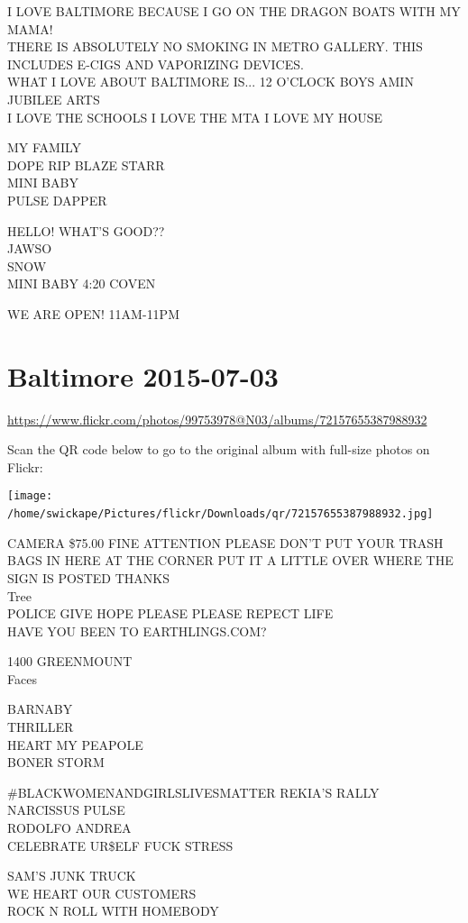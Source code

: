 \documentclass[10pt,letterpaper]{article}
\begin{document}
I LOVE BALTIMORE BECAUSE I GO ON THE DRAGON BOATS WITH MY MAMA!\\
THERE IS ABSOLUTELY NO SMOKING IN METRO GALLERY.  THIS INCLUDES E{-}CIGS AND VAPORIZING DEVICES.\\
WHAT I LOVE ABOUT BALTIMORE IS... 12 O'CLOCK BOYS AMIN JUBILEE ARTS\\
I LOVE THE SCHOOLS I LOVE THE MTA I LOVE MY HOUSE

MY FAMILY\\
DOPE RIP BLAZE STARR\\
MINI BABY\\
PULSE DAPPER

HELLO!  WHAT'S GOOD??\\
JAWSO\\
SNOW\\
MINI BABY 4:20 COVEN

WE ARE OPEN!  11AM{-}11PM
\

\section*{Baltimore 2015-07-03}

\url{https://www.flickr.com/photos/99753978@N03/albums/72157655387988932}

Scan the QR code below to go to the original album with full-size photos on Flickr:

\texttt{[image: /home/swickape/Pictures/flickr/Downloads/qr/72157655387988932.jpg]}
\

CAMERA \$75.00 FINE ATTENTION PLEASE DON'T PUT YOUR TRASH BAGS IN HERE AT THE CORNER PUT IT A LITTLE OVER WHERE THE SIGN IS POSTED THANKS\\
Tree\\
POLICE GIVE HOPE PLEASE PLEASE REPECT LIFE\\
HAVE YOU BEEN TO EARTHLINGS.COM?

1400 GREENMOUNT\\
Faces

BARNABY\\
THRILLER\\
HEART MY PEAPOLE\\
BONER STORM

\#BLACKWOMENANDGIRLSLIVESMATTER REKIA'S RALLY\\
NARCISSUS PULSE\\
RODOLFO ANDREA\\
CELEBRATE UR\$ELF FUCK STRESS

SAM'S JUNK TRUCK\\
WE HEART OUR CUSTOMERS\\
ROCK N ROLL WITH HOMEBODY
\end{document}
